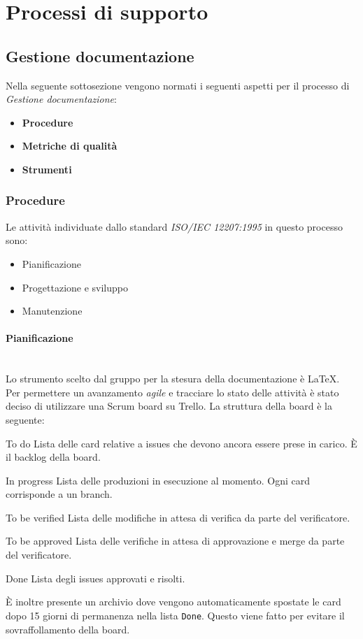 \section{Processi di supporto}
\subsection{Gestione documentazione}
Nella seguente sottosezione vengono normati i seguenti aspetti per il 
processo di \textit{Gestione documentazione}:
\begin{itemize}
    \item \textbf{Procedure}
    \item \textbf{Metriche di qualità}
    \item \textbf{Strumenti}
\end{itemize}

\subsubsection{Procedure}
Le attività individuate dallo standard \textit{ISO/IEC 12207:1995} in questo processo sono:
\begin{itemize}
    \item Pianificazione
    \item Progettazione e sviluppo
    \item Manutenzione
\end{itemize}

\paragraph{Pianificazione}
\mbox{}\\
Lo strumento scelto dal gruppo per la stesura della documentazione è \LaTeX.\\
Per permettere un avanzamento \textit{agile} e tracciare lo stato delle attività è stato deciso di utilizzare una Scrum board su Trello.
La struttura della board è la seguente:
\begin{itemdescript}
    \item [To do] Lista delle card relative a issues che devono ancora essere prese in carico. È il backlog della board.
    \item [In progress] Lista delle produzioni in esecuzione al momento. Ogni card corrisponde a un branch.
    \item [To be verified] Lista delle modifiche in attesa di verifica da parte del verificatore.
    \item [To be approved] Lista delle verifiche in attesa di approvazione e merge da parte del verificatore.
    \item [Done] Lista degli issues approvati e risolti.
\end{itemdescript}
È inoltre presente un archivio dove vengono automaticamente spostate le card dopo 15 giorni di permanenza nella lista \texttt{Done}. Questo viene fatto per evitare il sovraffollamento della board.\\


